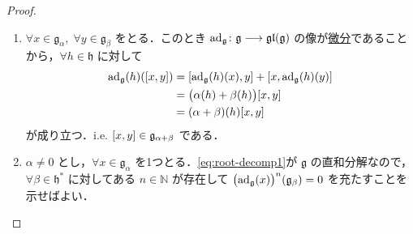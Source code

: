 \documentclass[rep_main]{subfiles}
\begin{document}
\begin{proof}
	\begin{enumerate}
		\item $\forall x \in \mathfrak{g}_\alpha,\; \forall y \in \mathfrak{g}_\beta$ をとる．このとき $\operatorname{ad}_{\mathfrak{g}} \colon \mathfrak{g} \longrightarrow \mathfrak{gl}(\mathfrak{g})$ の像が\hyperref[def:derivation-Alg]{微分}であることから，$\forall h \in \mathfrak{h}$ に対して
		\begin{align}
			\ad_{\mathfrak{g}}(h)(\comm{x}{y}) 
			&= \comm{\ad_{\mathfrak{g}}(h)(x)}{y} + \comm{x}{\ad_{\mathfrak{g}}(h)(y)} \\
			&= \bigl(\alpha(h) + \beta(h)\bigr) \comm{x}{y} \\
			&= (\alpha + \beta)(h) \comm{x}{y}
		\end{align}
		が成り立つ．i.e. $\comm{x}{y} \in \mathfrak{g}_{\alpha + \beta}$ である．
		\item $\alpha \neq 0$ とし，$\forall x \in \mathfrak{g}_\alpha$ を1つとる．\eqref{eq:root-decomp1}が $\mathfrak{g}$ の直和分解なので，$\forall \beta \in \mathfrak{h}^*$ に対してある $n \in \mathbb{N}$ が存在して $\bigl(\operatorname{ad}_{\mathfrak{g}}(x)\bigr)^n (\mathfrak{g}_\beta) = 0$ を充たすことを示せばよい．
		

\end{enumerate}
\end{proof}
\end{document}

